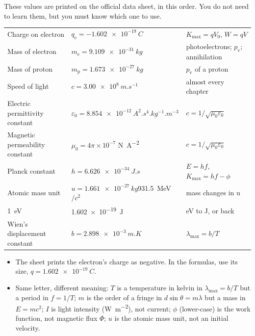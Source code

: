These values are printed on the official data sheet, in this order. You do not need to
learn them, but you must know which one to use.

\begin{table}
  \centering\small
  \renewcommand\arraystretch{1.15}
  \begin{tabular}{@{}L{50mm}L{54mm}L{36mm}@{}}
    \toprule
     &  & \\
    \midrule
    Charge on electron & $q_\mathrm{e} = \qty{-1.602e-19}{C}$
      & $K_\mathrm{max} = qV_0$, $W = qV$\\
    Mass of electron & $m_\mathrm{e} = \qty{9.109e-31}{kg}$
      & photoelectrons; $p_\mathrm{v}$; annihilation\\
    Mass of proton & $m_\mathrm{p} = \qty{1.673e-27}{kg}$ & $p_\mathrm{v}$ of a proton\\
    Speed of light & $c = \qty{3.00e8}{m.s^{-1}}$ & almost every chapter\\
    Electric permittivity constant & $\varepsilon_0 = \qty{8.854e-12}{A^2.s^4.kg^{-1}.m^{-3}}$
      & $c = 1/\sqrt{\mu_0\varepsilon_0}$\\
    Magnetic permeability constant & $\mu_0 = 4\pi \times 10^{-7}$ \si{N.A^{-2}}
      & $c = 1/\sqrt{\mu_0\varepsilon_0}$\\
    Planck constant & $h = \qty{6.626e-34}{J.s}$ & $E = hf$, $K_\mathrm{max} = hf - \phi$\\
    Atomic mass unit & $u = \qty{1.661e-27}{kg}$\newline \qty{931.5}{\mega\eV}$/c^2$
      & mass changes in \si{\amu}\\
    \qty{1}{eV} & \qty{1.602e-19}{J} & \si{eV} to \si{J}, or back\\
    Wien's displacement constant & $b = \qty{2.898e-3}{m.K}$
      & $\lambda_\mathrm{max} = b/T$\\
    \bottomrule
  \end{tabular}
\end{table}

\begin{itemize}
  \item The sheet prints the electron's charge as negative. In the formulas, use its size,
        $q = \qty{1.602e-19}{C}$.
  \item Same letter, different meaning: $T$ is a temperature in kelvin in
        $\lambda_\mathrm{max} = b/T$ but a period in $f = 1/T$; $m$ is the order of a fringe
        in $d\sin\theta = m\lambda$ but a mass in $E = mc^2$; $I$ is light intensity
        (\si{W.m^{-2}}), not current; $\phi$ (lower-case) is the work function, not magnetic
        flux $\Phi$; $u$ is the atomic mass unit, not an initial velocity.
\end{itemize}
